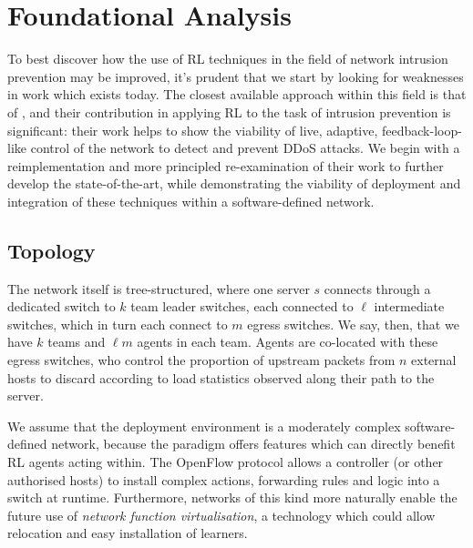 \documentclass[conference, letterpaper, 10pt, times]{IEEEtran}
\begin{document}
\section{Foundational Analysis}\label{sec:environment-and-rl-algorithm}
To best discover how the use of RL techniques in the field of network intrusion prevention may be improved, it's prudent that we start by looking for weaknesses in work which exists today.
The closest available approach within this field is that of \textcite{DBLP:journals/eaai/MalialisK15}, and their contribution in applying RL to the task of intrusion prevention is significant: their work helps to show the viability of live, adaptive, feedback-loop-like control of the network to detect and prevent DDoS attacks.
We begin with a reimplementation and more principled re-examination of their work to further develop the state-of-the-art, while demonstrating the viability of deployment and integration of these techniques within a software-defined network.



\subsection{Topology}\label{sec:topology}

The network itself is tree-structured, where one server $s$ connects through a dedicated switch to $k$ team leader switches, each connected to $\ell$ intermediate switches, which in turn each connect to $m$ egress switches.
We say, then, that we have $k$ teams and $\ell m$ agents in each team.
Agents are co-located with these egress switches, who control the proportion of upstream packets from $n$ external hosts to discard according to load statistics observed along their path to the server.

We assume that the deployment environment is a moderately complex software-defined network, because the paradigm offers features which can directly benefit RL agents acting within.
The OpenFlow protocol allows a controller (or other authorised hosts) to install complex actions, forwarding rules and logic into a switch at runtime.
Furthermore, networks of this kind more naturally enable the future use of \emph{network function virtualisation}, a technology which could allow relocation and easy installation of learners.
\end{document}
